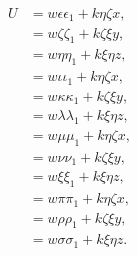 \documentclass[11pt,a4paper]{article}
\theoremstyle{definition}
\begin{document}
\newpage

\setcounter{page}{450}

\begin{align*}
U &= w\epsilon\epsilon_{1} + k\eta\zeta x, \\
&= w\zeta\zeta_{1} + k\zeta\xi y, \\
&= w\eta\eta_{1} + k\xi\eta z, \\
&= w\iota\iota_{1} + k\eta\zeta x, \\
&= w\kappa\kappa_{1} + k\zeta\xi y, \\
&= w\lambda\lambda_{1} + k\xi\eta z, \\
&= w\mu\mu_{1} + k\eta\zeta x, \\
&= w\nu\nu_{1} + k\zeta\xi y, \\
&= w\xi\xi_{1} + k\xi\eta z, \\
&= w\pi\pi_{1} + k\eta\zeta x, \\
&= w\rho\rho_{1} + k\zeta\xi y, \\
&= w\sigma\sigma_{1} + k\xi\eta z.
\end{align*}
\end{document}

